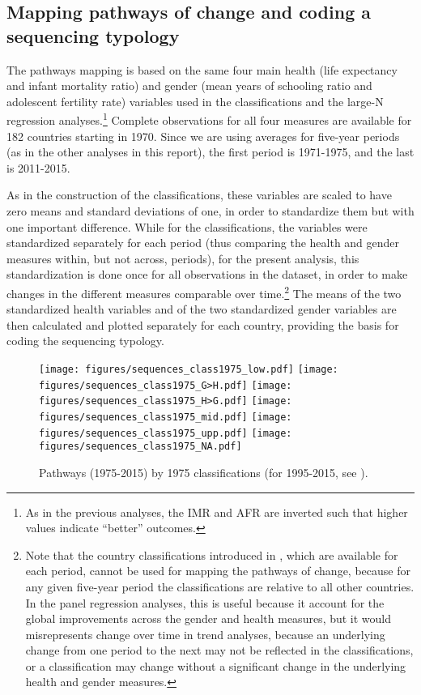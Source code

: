 \documentclass[12pt]{article}
\begin{document}
\subsection{Mapping pathways of change and coding a sequencing typology}

The pathways mapping is based on the same four main health (life expectancy and infant mortality ratio) and gender (mean years of schooling ratio and adolescent fertility rate) variables used in the classifications and the large-N regression analyses.\footnote{
As in the previous analyses, the IMR and AFR are inverted such that higher values indicate \enquote{better} outcomes.}
Complete observations for all four measures are available for 182 countries starting in 1970.
Since we are using averages for five-year periods (as in the other analyses in this report), the first period is 1971-1975, and the last is 2011-2015.

As in the construction of the classifications, these variables are scaled to have zero means and standard deviations of one, in order to standardize them but with one important difference.
While for the classifications, the variables were standardized separately for each period (thus comparing the health and gender measures within, but not across, periods), for the present analysis, this standardization is done once for all observations in the dataset, in order to make changes in the different measures comparable over time.\footnote{
Note that the country classifications introduced in , which are available for each period, cannot be used for mapping the pathways of change, because for any given five-year period the classifications are relative to all other countries. In the panel regression analyses, this is useful because it account for the global improvements across the gender and health measures, but it would misrepresents change over time in trend analyses, because an underlying change from one period to the next may not be reflected in the classifications, or a classification may change without a significant change in the underlying health and gender measures.}
The means of the two standardized health variables and of the two standardized gender variables are then calculated and plotted separately for each country, providing the basis for coding the sequencing typology.

\begin{figure}[htbp]
    \centering
    \caption{Pathways (1975-2015) by 1975 classifications (for 1995-2015, see ).}
    \label{sequences_class1975}
    \texttt{[image: figures/sequences\_class1975\_low.pdf]}
    \texttt{[image: figures/sequences\_class1975\_G>H.pdf]}
    \texttt{[image: figures/sequences\_class1975\_H>G.pdf]}
    \texttt{[image: figures/sequences\_class1975\_mid.pdf]}
    \texttt{[image: figures/sequences\_class1975\_upp.pdf]}
    \texttt{[image: figures/sequences\_class1975\_NA.pdf]}
\end{figure}
\end{document}
